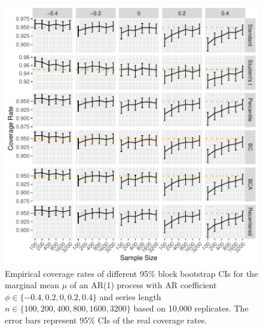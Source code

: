 \documentclass[12pt, letterpaper, titlepage]{article}
\begin{document}
\begin{figure}[tbp]
  \centering
  \includegraphics[width=\textwidth]{figures/plot_norm_mu}
  \caption{Empirical coverage rates of different 95\% block bootstrap CIs for
    the marginal mean $\mu$ of an AR(1) process with AR coefficient
    $\phi \in \{-0.4, 0.2, 0, 0.2, 0.4\}$ and series length
    $n \in \{100, 200, 400, 800, 1600, 3200\}$ based on 10,000 replicates. The
    error bars represent 95\% CIs of the real coverage rates.}
  \label{fig:mu}
\end{figure}
\end{document}
